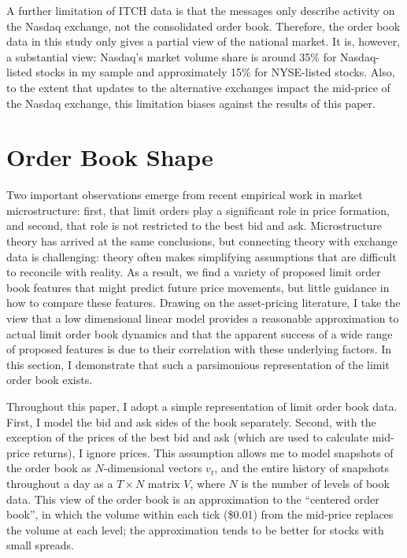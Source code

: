 	A further limitation of ITCH data is that the messages only describe activity on the Nasdaq exchange, not the consolidated order book. Therefore, the order book data in this study only gives a partial view of the national market. It is, however, a substantial view: Nasdaq's market volume share is around 35\% for Nasdaq-listed stocks in my sample and approximately 15\% for NYSE-listed stocks. Also, to the extent that updates to the alternative exchanges impact the mid-price of the Nasdaq exchange, this limitation biases against the results of this paper.


\section{Order Book Shape}
	Two important observations emerge from recent empirical work in market microstructure: first, that limit orders play a significant role in price formation, and second, that role is not restricted to the best bid and ask. Microstructure theory has arrived at the same conclusions, but connecting theory with exchange data is challenging: theory often makes simplifying assumptions that are difficult to reconcile with reality. As a result, we find a variety of proposed limit order book features that might predict future price movements, but little guidance in how to compare these features. Drawing on the asset-pricing literature, I take the view that a low dimensional linear model provides a reasonable approximation to actual limit order book dynamics and that the apparent success of a wide range of proposed features is due to their correlation with these underlying factors. In this section, I demonstrate that such a parsimonious representation of the limit order book exists.

	Throughout this paper, I adopt a simple representation of limit order book data. First, I model the bid and ask sides of the book separately. Second, with the exception of the prices of the best bid and ask (which are used to calculate mid-price returns), I ignore prices. This assumption allows me to model snapshots of the order book as $N$-dimensional vectors $v_t$, and the entire history of snapshots throughout a day as a $T \times N$ matrix $V$, where $N$ is the number of levels of book data. This view of the order book is an approximation to the ``centered order book'', in which the volume within each tick (\$0.01) from the mid-price replaces the volume at each level; the approximation tends to be better for stocks with small spreads.


